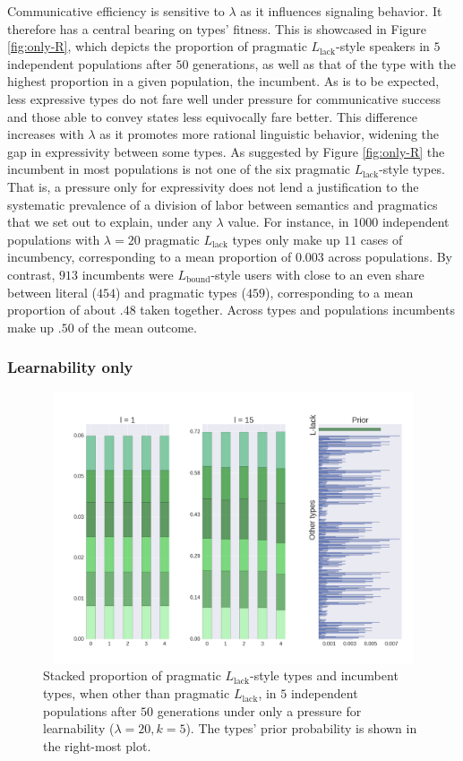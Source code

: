 \documentclass[a4paper]{article}
\newcommand{\mylang}[1]{\ensuremath{L_{\text{#1}}}\xspace} %
\newcommand{\Lbound}{\mylang{bound}}
\newcommand{\Llack}{\mylang{lack}}
\begin{document}
Communicative efficiency is sensitive to $\lambda$ as it influences signaling behavior. It therefore has a central bearing on types' fitness. This is showcased in Figure \ref{fig:only-R}, which depicts the proportion of pragmatic $\Llack$-style speakers in $5$ independent populations after $50$ generations, as well as that of the type with the highest proportion in a given population, the incumbent. As is to be expected, less expressive types do not fare well under pressure for communicative success and those able to convey states less equivocally fare better. This difference increases with $\lambda$ as it promotes more rational linguistic behavior, widening the gap in expressivity between some types. As suggested by Figure \ref{fig:only-R} the incumbent in most populations is not one of the six pragmatic $\Llack$-style types. That is, a pressure only for expressivity does not lend a justification to the systematic prevalence of a division of labor between semantics and pragmatics that we set out to explain, under any $\lambda$ value. For instance, in $1000$ independent populations with $\lambda = 20$ pragmatic $\Llack$ types only make up $11$ cases of incumbency, corresponding to a mean proportion of $0.003$ across populations. By contrast, $913$ incumbents were $\Lbound$-style users with close to an even share between literal ($454$) and pragmatic types ($459$), corresponding to a mean proportion of about $.48$ taken together. Across types and populations incumbents make up $.50$ of the mean outcome. 


\subsubsection{Learnability only}

\begin{figure}
\centering
\includegraphics[width=1\textwidth,height=8cm,keepaspectratio]{./plots/fig2-onlym-pr}
\caption{Stacked proportion of pragmatic $\Llack$-style types and incumbent types, when other than pragmatic $\Llack$, in $5$ independent populations after $50$ generations under only a pressure for learnability ($\lambda = 20, k = 5$). The types' prior probability is shown in the right-most plot.}
\label{fig:only-M}
\end{figure}
\end{document}
